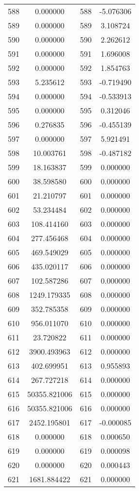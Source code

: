 \documentclass[12pt]{article}
\begin{document}
\begin{longtable}{@{}cccc@{}}
588 & 0.000000 & 588 & -5.076306 \\
589 & 0.000000 & 589 & 3.108724 \\
590 & 0.000000 & 590 & 2.262612 \\
591 & 0.000000 & 591 & 1.696008 \\
592 & 0.000000 & 592 & 1.854763 \\
593 & 5.235612 & 593 & -0.719490 \\
594 & 0.000000 & 594 & -0.533913 \\
595 & 0.000000 & 595 & 0.312046 \\
596 & 0.276835 & 596 & -0.455139 \\
597 & 0.000000 & 597 & 5.921491 \\
598 & 10.003761 & 598 & -0.487182 \\
599 & 18.163837 & 599 & 0.000000 \\
600 & 38.598580 & 600 & 0.000000 \\
601 & 21.210797 & 601 & 0.000000 \\
602 & 53.234484 & 602 & 0.000000 \\
603 & 108.414160 & 603 & 0.000000 \\
604 & 277.456468 & 604 & 0.000000 \\
605 & 469.549029 & 605 & 0.000000 \\
606 & 435.020117 & 606 & 0.000000 \\
607 & 102.587286 & 607 & 0.000000 \\
608 & 1249.179335 & 608 & 0.000000 \\
609 & 352.785358 & 609 & 0.000000 \\
610 & 956.011070 & 610 & 0.000000 \\
611 & 23.720822 & 611 & 0.000000 \\
612 & 3900.493963 & 612 & 0.000000 \\
613 & 402.699951 & 613 & 0.955893 \\
614 & 267.727218 & 614 & 0.000000 \\
615 & 50355.821006 & 615 & 0.000000 \\
616 & 50355.821006 & 616 & 0.000000 \\
617 & 2452.195801 & 617 & -0.000085 \\
618 & 0.000000 & 618 & 0.000650 \\
619 & 0.000000 & 619 & 0.000098 \\
620 & 0.000000 & 620 & 0.000443 \\
621 & 1681.884422 & 621 & 0.000000 \\

\end{longtable}
\end{document}
